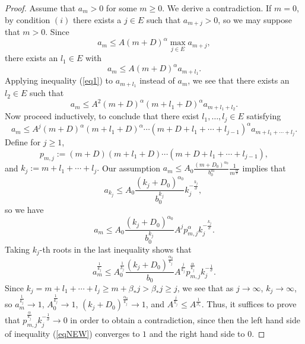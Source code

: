 \documentclass[12pt]{amsart}
\begin{document}
\begin{proof}
	Assume that $a_{m} > 0$ for some $m \ge 0$. We derive a contradiction. If $m =0$, by condition $(i)$ there exists a $j \in E$ such that $a_{m + j} > 0$, so we may suppose that $m > 0$. Since
	\begin{equation}
		a_{m}\leq A\left(  m+D\right)  ^{\alpha}\max_{j\in E}a_{m+j},\label{eq1}%
	\end{equation}
	there exists an $l_{1}\in E$ with
	\[
	a_{m}\leq A\left(  m+D\right)  ^{\alpha}a_{m+l_{1}}.
	\]
	Applying inequality (\ref{eq1}) to $a_{m+l_{1}}$ instead of $a_{m}$, we
	see that there exists an $l_{2}\in E$ such that
	\[
	a_{m}\leq A^{2}\left(  m+D\right)  ^{\alpha}\left(  m+l_{1}+D\right)
	^{\alpha}a_{m+l_{1}+l_{2}}.
	\]
	Now proceed inductively, to conclude that there exist $l_{1}, \dots,l_{j}\in E$
	satisfying
	\[
	a_{m}\leq A^{j}\left(  m+D\right)  ^{\alpha}\left(  m+l_{1}+D\right)
	^{\alpha}\cdots\left(  m+D+l_{1}+\cdots+l_{j-1}\right)  ^{\alpha}%
	a_{m+l_{1}+\cdots+l_{j}}.
	\]
	Define for $j \ge 1$, 
	\[
	p_{m,j} :=\left(  m+D\right)  \left(  m+l_{1}+D\right)  \cdots\left(
	m+D+l_{1}+\cdots+l_{j-1}\right),
	\]
	and $k_{j}:=
	m+l_{1}+\cdots+l_{j}.$ Our assumption $a_{m}\leq A_{0}\frac{\left(
		m+D_{0}\right)  ^{\alpha_{0}}}{b_{0}^{m}}\frac{1}{m^{\frac{m}{\sigma}}}$
	implies that
	\[
	a_{k_{j}}\leq A_{0}\frac{\left(  k_{j}+D_{0}\right)  ^{\alpha_{0}}}%
	{b_{0}^{k_{j}}}k_{j}^{-\frac{k_{j}}{\sigma}}, \
	\]
	so we have
	\[
	a_{m}\leq A_{0}\frac{\left(  k_{j}+D_{0}\right)  ^{\alpha_{0}}}{b_{0}^{k_{j}}%
	}A^{j}p_{m,j}^{\alpha}k_{j}^{-\frac{k_{j}}{\sigma}}.
	\]
	Taking $k_{j}$-th roots in the last inequality shows that
	\begin{equation}
		a_{m}^{\frac{1}{k_{j}}}\leq A_{0}^{\frac{1}{k_{j}}}\frac{\left(  k_{j}%
			+D_{0}\right)  ^{\frac{\alpha_{0}}{k_{j}}}}{b_{0}}A^{\frac{j}{k_{j}}}%
		p_{m,j}^{\frac{\alpha}{k_{j}}}k_{j}^{-\frac{1}{\sigma}}.\label{eqNEW}%
	\end{equation}
	Since $k_{j}=m+l_{1}+\cdots+l_{j}\geq m+\beta_{\ast}j > \beta_{\ast}j \ge j$,   we see
	that as $j \to \infty$, $k_{j}\rightarrow\infty$, so
	$a_{m}^{\frac{1}{k_{j}}}\rightarrow 1$,  $A_{0}
	^{\frac{1}{k_{j}}}\rightarrow 1$, $\left(  k_{j}+D_{0}\right)
	^{\frac{\alpha_{0}}{k_{j}}}\rightarrow1$, and $A^{\frac{j}{k_{j}}} \le
	A^{\frac{1}{\beta_{\ast}}}$. Thus, it suffices  to prove
	that $p_{m,j}^{\frac{\alpha}{k_{j}}}k_{j}^{-\frac{1}{\sigma}}\rightarrow0$ in order to
	obtain a contradiction, since then the left hand side of inequality (\ref{eqNEW}) converges to
	$1$ and the right hand side to $0.$ 
	

\end{proof}
\end{document}
